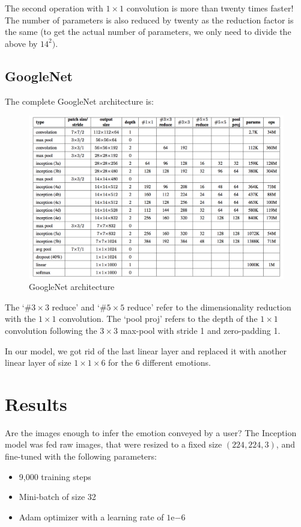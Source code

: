 The second operation with $1\times 1$ convolution is more than twenty times faster! The number of parameters is also reduced by twenty as the reduction factor is the same (to get the actual number of parameters, we only need to divide the above by $14^2)$.

\subsection{GoogleNet}
The complete GoogleNet architecture is:

\begin{figure}[H]
    \centering
    \includegraphics[width=\textwidth]{Images/googlenet.png}
    \caption{GoogleNet architecture\cite{googlenet}}
\end{figure}

The `\#$3\times3$ reduce' and `\#$5\times5$ reduce' refer to the dimensionality reduction with the $1\times1$ convolution. The `pool proj' refers to the depth of the $1\times1$ convolution following the $3\times3$ max-pool with stride 1 and zero-padding 1.

In our model, we got rid of the last linear layer and replaced it with another linear layer of size $1 \times 1 \times 6$ for the 6 different emotions.

\newpage
\section{Results}
Are the images enough to infer the emotion conveyed by a user? The Inception model was fed raw images, that were resized to a fixed size $(224, 224, 3)$, and fine-tuned with the following parameters:
\begin{itemize}[topsep=0pt]
    \itemsep-1em
    \item 9,000 training steps
    \item Mini-batch of size 32
    \item Adam optimizer with a learning rate of $1\mathrm{e}{-6}$
\end{itemize}

